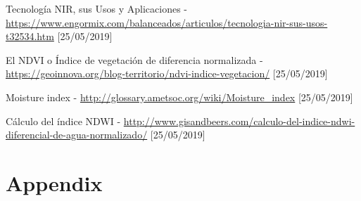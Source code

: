 \documentclass[10pt,a4paper,twocolumn,twoside]{article}
\begin{document}
\begin{thebibliography}{11}
Tecnología NIR, sus Usos y Aplicaciones - \url{https://www.engormix.com/balanceados/articulos/tecnologia-nir-sus-usos-t32534.htm} [25/05/2019]

El NDVI o Índice de vegetación de diferencia normalizada - \url{https://geoinnova.org/blog-territorio/ndvi-indice-vegetacion/} [25/05/2019]

Moisture index - \url{http://glossary.ametsoc.org/wiki/Moisture_index} [25/05/2019]

Cálculo del índice NDWI - \url{http://www.gisandbeers.com/calculo-del-indice-ndwi-diferencial-de-agua-normalizado/} [25/05/2019]

\end{thebibliography}

\newpage
\appendix
\section*{Appendix}

\setcounter{section}{1}
\end{document}
